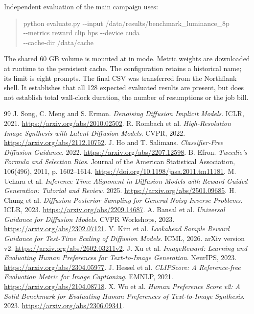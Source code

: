 \documentclass[11pt,a4paper]{article}
\newcommand{\code}[1]{\texttt{\detokenize{#1}}}
\begin{document}
Independent evaluation of the main campaign uses:
\begin{quote}\small\ttfamily
python evaluate.py -{}-input /data/results/benchmark\_luminance\_8p\\
\hspace*{1em}-{}-metrics reward clip hps -{}-device cuda\\
\hspace*{1em}-{}-cache-dir /data/cache
\end{quote}
The shared 60 GB volume is mounted at \code{/data} in \code{ReadWriteMany} mode. Metric weights are downloaded at runtime to the persistent cache. The configuration \code{benchmark_luminance_10p.json} retains a historical name; its limit is eight prompts. The final CSV was transferred from the Northflank shell. It establishes that all 128 expected evaluated results are present, but does not establish total wall-clock duration, the number of resumptions or the job bill.

\clearpage
\begin{thebibliography}{99}
 J. Song, C. Meng and S. Ermon. \emph{Denoising Diffusion Implicit Models}. ICLR, 2021. \url{https://arxiv.org/abs/2010.02502}.
 R. Rombach et al. \emph{High-Resolution Image Synthesis with Latent Diffusion Models}. CVPR, 2022. \url{https://arxiv.org/abs/2112.10752}.
 J. Ho and T. Salimans. \emph{Classifier-Free Diffusion Guidance}. 2022. \url{https://arxiv.org/abs/2207.12598}.
 B. Efron. \emph{Tweedie's Formula and Selection Bias}. Journal of the American Statistical Association, 106(496), 2011, p. 1602--1614. \url{https://doi.org/10.1198/jasa.2011.tm11181}.
 M. Uehara et al. \emph{Inference-Time Alignment in Diffusion Models with Reward-Guided Generation: Tutorial and Review}. 2025. \url{https://arxiv.org/abs/2501.09685}.
 H. Chung et al. \emph{Diffusion Posterior Sampling for General Noisy Inverse Problems}. ICLR, 2023. \url{https://arxiv.org/abs/2209.14687}.
 A. Bansal et al. \emph{Universal Guidance for Diffusion Models}. CVPR Workshops, 2023. \url{https://arxiv.org/abs/2302.07121}.
 Y. Kim et al. \emph{Lookahead Sample Reward Guidance for Test-Time Scaling of Diffusion Models}. ICML, 2026. arXiv version v2. \url{https://arxiv.org/abs/2602.03211v2}.
 J. Xu et al. \emph{ImageReward: Learning and Evaluating Human Preferences for Text-to-Image Generation}. NeurIPS, 2023. \url{https://arxiv.org/abs/2304.05977}.
 J. Hessel et al. \emph{CLIPScore: A Reference-free Evaluation Metric for Image Captioning}. EMNLP, 2021. \url{https://arxiv.org/abs/2104.08718}.
 X. Wu et al. \emph{Human Preference Score v2: A Solid Benchmark for Evaluating Human Preferences of Text-to-Image Synthesis}. 2023. \url{https://arxiv.org/abs/2306.09341}.
\end{thebibliography}
\end{document}
